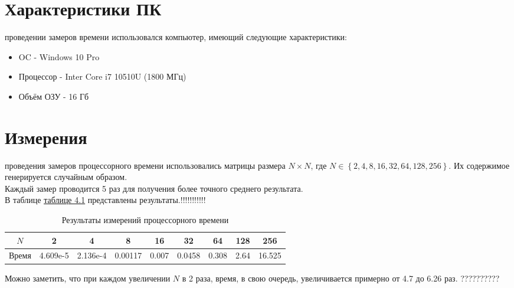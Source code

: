 

\section{Характеристики ПК}
 проведении замеров времени использовался компьютер, имеющий следующие характеристики:
\begin{itemize}
	\item OC - Windows 10 Pro
	\item Процессор - Inter Core i7 10510U (1800 МГц)
	\item Объём ОЗУ - 16 Гб
\end{itemize}

\section{Измерения}
 проведения замеров процессорного времени использовались матрицы размера $N \times N$, где $N \in \left\lbrace 2, 4, 8, 16, 32, 64, 128, 256 \right\rbrace$.
Их содержимое генерируется случайным образом.\\ 

Каждый замер проводится 5 раз для получения более точного среднего результата. \\

В таблице \hyperref[table_time]{таблице 4.1} представлены результаты.!!!!!!!!!!!

\begin{table}[ph] \label{table_time}
	\caption{Результаты измерений процессорного времени}
	\centering
	\begin{tabular}{|c|c|c|c|c|c|c|c|c|}
		\hline
		$N$ &2 &4 &8 &16 &32 &64 &128 &256\\
		\hline
		Время    &4.609e-5 &2.136e-4 &0.00117 &0.007 &0.0458 &0.308 &2.64 &16.525\\
		\hline
	\end{tabular}
\end{table}

Можно заметить, что при каждом увеличении $N$ в 2 раза, время, в свою очередь, увеличивается примерно от 4.7 до 6.26 раз. ??????????